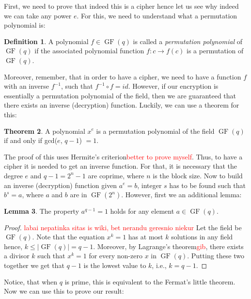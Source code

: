 \documentclass{Resources/UoBLab1}
\theoremstyle{definition}
\newtheorem{theorem}{Theorem}[section]
\newtheorem{definition}[theorem]{Definition}
\newtheorem{lemma}[theorem]{Lemma}
\begin{document}
First, we need to prove that indeed this is a cipher hence let us see why indeed we can take any power $e$. For this, we need to understand what a permutation polynomial is:
\begin{definition}
    A polynomial $f \in \operatorname{GF}(q)$ is called a \textit{permutation polynomial} of $\operatorname{GF}(q)$ if the associated polynomial function $f : c \to f(c)$ is a permutation of $\operatorname{GF}(q)$. 
\end{definition}
Moreover, remember, that in order to have a cipher, we need to have a function $f$ with an inverse $f^{-1}$, such that $f^{-1} \circ f = id$. However, if our encryption is essentially a permutation polynomial of the field, then we are guaranteed that there exists an inverse (decryption) function. Luckily, we can use a theorem for this:
\begin{theorem}
    A polynomial $x^e$ is a permutation polynomial of the field $\operatorname{GF}(q)$ if and only if gcd($e$, $q - 1$) $= 1$.
\end{theorem}
The proof of this uses Hermite's criterion\cite{PPIntro}\textcolor{red}{better to prove myself}. Thus, to have a cipher it is needed to get an inverse function. For that, it is necessary that the degree $e$ and $q - 1 = 2^n - 1$ are coprime, where $n$ is the block size. Now to build an inverse (decryption) function given $a^e = b$, integer $s$ has to be found such that $b^s = a$, where $a$ and $b$ are in $\operatorname{GF}(2^n)$. However, first we an additional lemma:
\begin{lemma}\label{lem:GroupProp}
    The property $a^{q-1} = 1$ holds for any element $a \in \operatorname{GF}(q)$.
\end{lemma}
\begin{proof}
    \textcolor{red}{labai nepatinka sitas is wiki, bet nerandu geresnio niekur} Let the field be $\operatorname{GF}(q)$. Note that the equation $x^k = 1$ has at most $k$ solutions in any field hence, $k \le |\operatorname{GF}(q)| = q - 1$. Moreover, by Lagrange's theorem\textcolor{red}{gib}, there exists a divisor $k$ such that $x^k = 1$ for every non-zero $x$ in $\operatorname{GF}(q)$. Putting these two together we get that $q-1$ is the lowest value to $k$, i.e., $k = q - 1$.
\end{proof}
Notice, that when $q$ is prime, this is equivalent to the Fermat's little theorem. Now we can use this to prove our result:
\end{document}
